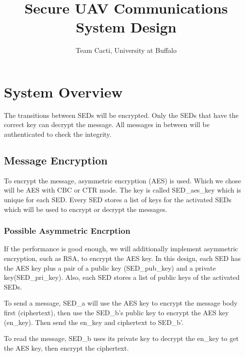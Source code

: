 \documentclass[11pt,oneside,onecolumn,letterpaper]{article}
\title{Secure UAV Communications System Design}
\author{Team Cacti, University at Buffalo}
\date{}
\begin{document}
\normalsize


\maketitle

\renewcommand{\thepage}{System Design, Cacti, UB--\arabic{page}}
\setcounter{page}{1} \normalsize
%

\newcommand{\flagRollback}{\textsf{Rollback}\xspace}

\section{System Overview}

The transitions between SEDs will be encrypted.
Only the SEDs that have the correct key can decrypt the message.
All messages in between will be authenticated to check the integrity.

\subsection{Message Encryption}
To encrypt the message, asymmetric encryption (AES) is used.
Which we chose will be AES with CBC or CTR mode.
The key is called SED\_aes\_key which is unique for each SED.
Every SED stores a list of keys for the activated SEDs which will be used to encrypt or decrypt the messages.

\subsubsection{Possible Asymmetric Encrption}
If the performance is good enough, we will additionally implement asymmetric encryption, such as RSA, to encrypt the AES key.
In this design, each SED has the AES key plus a pair of a public key (SED\_pub\_key) and a private key(SED\_pri\_key).
Also, each SED stores a list of public keys of the activated SEDs.

To send a message, SED\_a will use the AES key to encrypt the message body first (ciphertext), then use the SED\_b's public key to encrypt the AES key (en\_key).
Then send the en\_key and ciphertext to SED\_b'.

To read the message, SED\_b uses its private key to decrypt the en\_key to get the AES key, then encrypt the ciphertext. 
\end{document}
